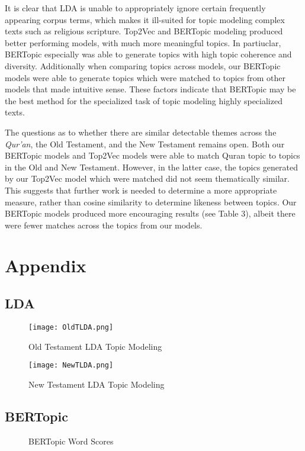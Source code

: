 \documentclass{article}
\begin{document}
It is clear that LDA is unable to appropriately ignore certain frequently appearing corpus terms, which makes it ill-suited for topic modeling complex texts such as religious scripture. Top2Vec and BERTopic modeling produced better performing models, with much more meaningful topics. In partiuclar, BERTopic especially was able to generate topics with high topic coherence and diversity. Additionally when comparing topics across models, our BERTopic models were able to generate topics which were matched to topics from other models that made intuitive sense. These factors indicate that BERTopic may be the best method for the specialized task of topic modeling highly specialized texts. 

The questions as to whether there are similar detectable themes across the \textit{Qur'an}, the Old Testament, and the New Testament remains open. Both our BERTopic models and Top2Vec models were able to match Quran topic to topics in the Old and New Testament. However, in the latter case, the topics generated by our Top2Vec model which were matched did not seem thematically similar. This suggests that further work is needed to determine a more appropriate measure, rather than cosine similarity to determine likeness between topics. Our BERTopic models produced more encouraging results (see Table 3), albeit there were fewer matches across the topics from our models.  

\pagebreak
\section{Appendix}
\subsection{LDA}
    \begin{figure}[H]
        \centering
        \texttt{[image: OldTLDA.png]}
        \caption{Old Testament LDA Topic Modeling}
        \label{fig:enter-label}
    \end{figure}
    \begin{figure}[H]
        \centering
        \texttt{[image: NewTLDA.png]}
        \caption{New Testament LDA Topic Modeling}
        \label{fig:enter-label}
    \end{figure}
\subsection{BERTopic}
    \begin{figure}[H]
        \caption{BERTopic Word Scores}
        \label{fig:enter-label}
    \end{figure}
\end{document}
